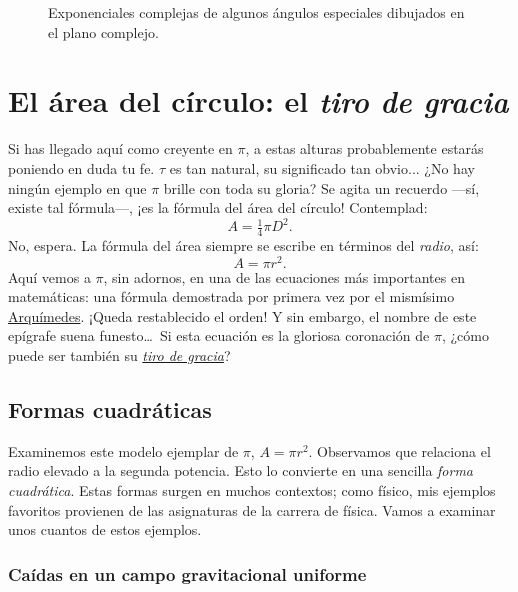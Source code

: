 \begin{figure}
\begin{center}
\end{center}
\caption{Exponenciales complejas de algunos ángulos especiales dibujados en el plano complejo.\label{fig:tau_euler_circle}}
\end{figure}


\section{El área del círculo: el \emph{tiro de gracia}} %
\label{sec:circular_area}

Si has llegado aquí como creyente en $\pi$, a estas alturas probablemente estarás poniendo en duda tu fe. $\tau$ es tan natural, su significado tan obvio... ¿No hay ningún ejemplo en que $\pi$ brille con toda su gloria? Se agita un recuerdo ---sí, existe tal fórmula---, ¡es la fórmula del área del círculo! Contemplad:
\[ A = \tfrac{1}{4} \pi D^2. \]
No, espera. La fórmula del área siempre se escribe en términos del \emph{radio}, así:
\[ A = \pi r^2. \]
Aquí vemos a $\pi$, sin adornos, en una de las ecuaciones más importantes en matemáticas: una fórmula demostrada por primera vez por el mismísimo \href{https://es.wikipedia.org/wiki/Arquímedes}{Arquímedes}. ¡Queda restablecido el orden! Y sin embargo, el nombre de este epígrafe suena funesto\ldots\ Si esta ecuación es la gloriosa coronación de $\pi$, ¿cómo puede ser también su \href{https://es.wikipedia.org/wiki/Tiro_de_gracia}{\emph{tiro de gracia}}?


  \subsection{Formas cuadráticas} %
  \label{sec:quadratic_forms}

Examinemos este modelo ejemplar de $\pi$, $A = \pi r^2$. Observamos que relaciona el radio elevado a la segunda potencia. Esto lo convierte en una sencilla \emph{forma cuadrática}. Estas formas surgen en muchos contextos; como físico, mis ejemplos favoritos provienen de las asignaturas de la carrera de física. Vamos a examinar unos cuantos de estos ejemplos.

    \subsubsection{Caídas en un campo gravitacional uniforme} %
    \label{sec:falling_in_a_uniform_gravitational_field}

